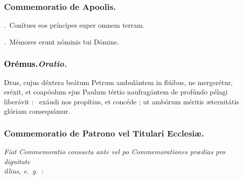 \documentclass[12pt]{article} %
\newenvironment{rubric}{\color{benred8} \itshape \leftskip 0in \setlength{\parindent}{0.25in}}{\vspace{2 mm}}
\newenvironment{response}{\leftskip 0in \setlength{\parindent}{0in}}{\vspace{2 mm}}
\let\oldgresixstar\gresixstar
\renewcommand{\gresixstar}{\textcolor{benred8}{\oldgresixstar}}
\let\oldVbar\Vbar
\renewcommand{\Vbar}{\textcolor{benred8}{\oldVbar .}}
\let\oldRbar\Rbar
\renewcommand{\Rbar}{\textcolor{benred8}{\oldRbar .}}
\def\capitulumSpace{\hspace{20 mm}}
\begin{document}
\subsubsection*{Commemoratio de Apoolis.}


\gresetfirstlineaboveinitial{\small \textsc{ \textbf{\textcolor{benred8}{VIII}}}}{\small \textsc{ \textbf{\textcolor{benred8}{VIII}}}}

\begin{response}
\Vbar\ Con\'{i}tues eos pr\'{i}ncipes super omnem terram.

\Rbar\ M\'{e}mores erunt n\'{o}minis tui D\'{o}mine.

\end{response}

\subsubsection*{\textcolor{black}{Or\'{e}mus.}\capitulumSpace \emph{Oratio.}}

\begin{response}\lettrine{D}{e}us, cujus d\'{e}xtera be\'{a}tum Petrum ambul\'{a}ntem in fl\'{u}ibus, ne merger\'{e}tur, er\'{e}xit, et coap\'{o}olum ejus Paulum t\'{e}rtio naufrag\'{a}ntem de prof\'{u}ndo p\'{e}lagi liber\'{a}vit : \gresixstar\ ex\'{a}udi nos prop\'{i}tius, et conc\'{e}de ; ut amb\'{o}rum m\'{e}ritis \ae ternit\'{a}tis gl\'{o}riam consequ\'{a}mur.

\end{response}

\newpage


\subsubsection*{Commemoratio de Patrono vel Titulari Ecclesi\ae .}

\begin{rubric}
Fiat Commemoratio consueta ante vel po Commemorationes pr\ae dias pro dignitate\\illius, e.~g.~:

\end{rubric}
\end{document}
